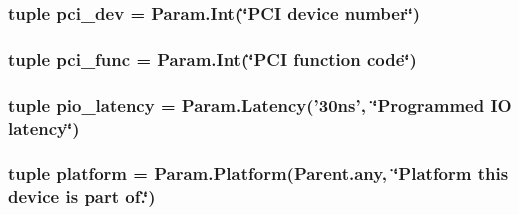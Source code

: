 \label{classPci_1_1PciDevice_a538a7615188508d868dc8e9fc8f03ced}
\hypertarget{classPci_1_1PciDevice_ad03b795fdff18a28678e61a28edbc095}{
\subsubsection[{pci\_\-dev}]{\setlength{\rightskip}{0pt plus 5cm}tuple {\bf pci\_\-dev} = Param.Int(\char`\"{}PCI device number\char`\"{})}}
\label{classPci_1_1PciDevice_ad03b795fdff18a28678e61a28edbc095}
\hypertarget{classPci_1_1PciDevice_ad3a2a2ca44f057aad936e91b7fb2efe0}{
\subsubsection[{pci\_\-func}]{\setlength{\rightskip}{0pt plus 5cm}tuple {\bf pci\_\-func} = Param.Int(\char`\"{}PCI function code\char`\"{})}}
\label{classPci_1_1PciDevice_ad3a2a2ca44f057aad936e91b7fb2efe0}
\hypertarget{classPci_1_1PciDevice_ac3f272675842a6662ce8782e10fdba39}{
\subsubsection[{pio\_\-latency}]{\setlength{\rightskip}{0pt plus 5cm}tuple {\bf pio\_\-latency} = Param.Latency('30ns', \char`\"{}Programmed IO latency\char`\"{})}}
\label{classPci_1_1PciDevice_ac3f272675842a6662ce8782e10fdba39}
\hypertarget{classPci_1_1PciDevice_ae6d09ca44893db6cdb66d62deaa1aefd}{
\subsubsection[{platform}]{\setlength{\rightskip}{0pt plus 5cm}tuple {\bf platform} = Param.Platform(Parent.any, \char`\"{}Platform this device is part of.\char`\"{})}}
